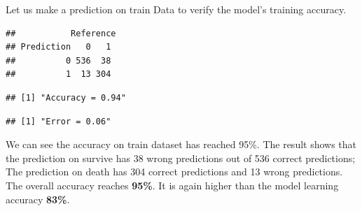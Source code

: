\documentclass[
]{book}
\newenvironment{Shaded}{\begin{snugshade}}{\end{snugshade}}
\newcommand{\CommentTok}[1]{\textcolor[rgb]{0.56,0.35,0.01}{\textit{#1}}}
\newcommand{\DecValTok}[1]{\textcolor[rgb]{0.00,0.00,0.81}{#1}}
\newcommand{\KeywordTok}[1]{\textcolor[rgb]{0.13,0.29,0.53}{\textbf{#1}}}
\newcommand{\NormalTok}[1]{#1}
\newcommand{\OperatorTok}[1]{\textcolor[rgb]{0.81,0.36,0.00}{\textbf{#1}}}
\newcommand{\StringTok}[1]{\textcolor[rgb]{0.31,0.60,0.02}{#1}}
\begin{document}
Let us make a prediction on train Data to verify the model's training accuracy.

\begin{Shaded}
\end{Shaded}

\begin{verbatim}
##           Reference
## Prediction   0   1
##          0 536  38
##          1  13 304
\end{verbatim}

\begin{Shaded}
\end{Shaded}

\begin{verbatim}
## [1] "Accuracy = 0.94"
\end{verbatim}

\begin{Shaded}
\end{Shaded}

\begin{verbatim}
## [1] "Error = 0.06"
\end{verbatim}

We can see the accuracy on train dataset has reached 95\%. The result shows that the prediction on survive has 38 wrong predictions out of 536 correct predictions; The prediction on death has 304 correct predictions and 13 wrong predictions. The overall accuracy reaches \textbf{95\%}. It is again higher than the model learning accuracy \textbf{83\%}.
\end{document}
